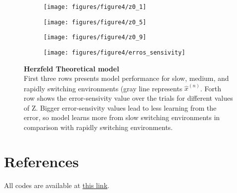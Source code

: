 \documentclass[9pt,twocolumn]{paper-template}
\begin{document}
\begin{figure*}[h!]
  \centering
  \begin{subfigure}[b]{0.9\linewidth}
    \texttt{[image: figures/figure4/z0\_1]}
  \end{subfigure}
  \begin{subfigure}[b]{0.9\linewidth}
    \texttt{[image: figures/figure4/z0\_5]}
  \end{subfigure}
   \begin{subfigure}[b]{0.9\linewidth}
    \texttt{[image: figures/figure4/z0\_9]}
  \end{subfigure}
    \begin{subfigure}[b]{0.9\linewidth}
    \texttt{[image: figures/figure4/erros\_sensivity]}
  \end{subfigure}
  \caption{\textbf{Herzfeld Theoretical model}\\
  {First three rows} presents model performance for slow, medium, and rapidly switching environments (gray line represents $\hat{x}^{(n)}$. {Forth row} shows the error-sensivity value over the trials for different values of Z. Bigger error-sensivity values lead to less learning from the error, so model learns more from slow switching environments in comparison with rapidly switching environments.
}
  \label{fig:herzfeld}
\end{figure*}


\newpage


\showacknow{} %

\section*{References}


\bigskip
\begin{center}
All codes are available at \href{https://github.com/MohammadAminAlamalhoda/Motor-Learning}{this link}.
\end{center}
\end{document}
